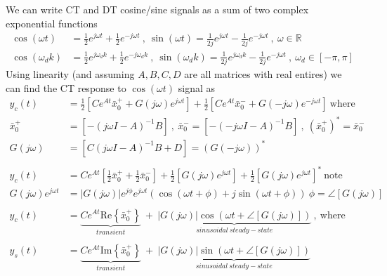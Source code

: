 \documentclass[twoside]{article}
\begin{document}
We can write CT and DT cosine/sine signals as a sum of two complex exponential functions
%
\begin{align*} 
 	\cos(\omega t) &= \frac{1}{2} e^{j \omega t} + \frac{1}{2} e^{-j \omega t} \ , \ \sin(\omega t) = \frac{1}{2 j} e^{j \omega t} - \frac{1}{2 j} e^{-j \omega t} \ , \ \omega \in \mathbb{R} 
	\\
	\cos(\omega_d k) &= \frac{1}{2} e^{j \omega_d k} + \frac{1}{2} e^{-j \omega_d k} \ , \ 	\sin(\omega_d k) = \frac{1}{2 j} e^{j \omega_d k} - \frac{1}{2 j} e^{-j \omega t} \ , \ \omega_d \in \left[ -\pi , \pi \right] 
\end{align*}
%
Using linearity (and assuming $A, B, C, D$ are all matrices with real entires) we can find the CT response to $\cos(\omega t)$ signal as
%
\begin{align*}
   y_c(t) &= \frac{1}{2} \left[ C e^{A t} \bar{x}_0^+ + G(j \omega) e^{j \omega t} \right] + \frac{1}{2} \left[ C e^{A t} \bar{x}_0^- + G(-j \omega) e^{-j \omega t} \right] \ \mathrm{where} \ 
   \\
   \bar{x}_0^+ &= \left[ - (j \omega I - A)^{-1} B \right]  \ , \ \bar{x}_0^- = \left[ - (-j \omega I - A)^{-1} B \right] \ , \ \left( \bar{x}_0^+ \right)^* = \bar{x}_0^- 
   \\
   G(j \omega) &= \left[ C (j \omega I - A)^{-1} B + D \right] = \left( G(-j \omega) \right)^*
   \\
   \\
   y_c(t) &= C e^{A t} \left[ \frac{1}{2} \bar{x}_0^+ + \frac{1}{2} \bar{x}_0^- \right] +
   \frac{1}{2} \left[ G(j \omega) e^{j \omega t} \right] + \frac{1}{2} \left[ G(j \omega) e^{j \omega t} \right]^* \ \mathrm{note} 
   \\
   G(j \omega) e^{j \omega t} &= |G(j \omega)| e^{j \phi} e^{j \omega t} \left( \cos (\omega t + \phi) + j \sin (\omega t + \phi) \right) \ \phi = \angle [G(j \omega)]
   \\
   \\
   y_c(t) &=  \underbrace{C e^{A t} \mathrm{Re}\left\lbrace \bar{x}_0^+ \right\rbrace}_{transient}  \ +  \  \underbrace{| G(j \omega) | \cos \left( \omega t + \angle [G(j \omega)] \right)}_{sinusoidal \ steady-state} \ , \ \mathrm{where}
   \\
   \\
   y_s(t) &=  \underbrace{C e^{A t} \mathrm{Im}\left\lbrace \bar{x}_0^+ \right\rbrace}_{transient}  \ +  \  \underbrace{| G(j \omega) | \sin \left( \omega t + \angle [G(j \omega)] \right)}_{sinusoidal \ steady-state}
\end{align*}
\end{document}
